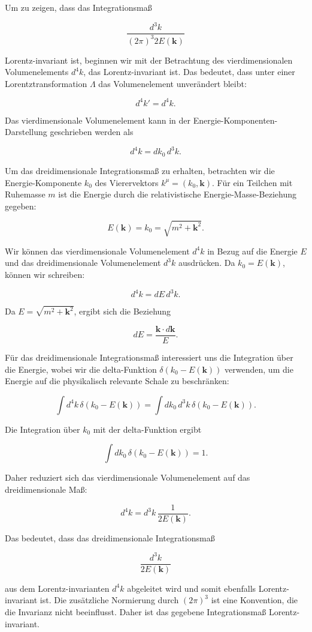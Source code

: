 Um zu zeigen, dass das Integrationsmaß 

\[
\frac{d^3 k}{(2 \pi)^3 2 E(\mathbf{k})}
\]

Lorentz-invariant ist, beginnen wir mit der Betrachtung des vierdimensionalen Volumenelements \(d^4 k\), das Lorentz-invariant ist. Das bedeutet, dass unter einer Lorentztransformation \(\Lambda\) das Volumenelement unverändert bleibt:

\[
d^4 k' = d^4 k.
\]

Das vierdimensionale Volumenelement kann in der Energie-Komponenten-Darstellung geschrieben werden als

\[
d^4 k = dk_0 \, d^3 k.
\]

Um das dreidimensionale Integrationsmaß zu erhalten, betrachten wir die Energie-Komponente \(k_0\) des Vierervektors \(k^\mu = (k_0, \mathbf{k})\). Für ein Teilchen mit Ruhemasse \(m\) ist die Energie durch die relativistische Energie-Masse-Beziehung gegeben:

\[
E(\mathbf{k}) = k_0 = \sqrt{m^2 + \mathbf{k}^2}.
\]

Wir können das vierdimensionale Volumenelement \(d^4 k\) in Bezug auf die Energie \(E\) und das dreidimensionale Volumenelement \(d^3 k\) ausdrücken. Da \(k_0 = E(\mathbf{k})\), können wir schreiben:

\[
d^4 k = dE \, d^3 k.
\]

Da \(E = \sqrt{m^2 + \mathbf{k}^2}\), ergibt sich die Beziehung

\[
dE = \frac{\mathbf{k} \cdot d\mathbf{k}}{E}.
\]

Für das dreidimensionale Integrationsmaß interessiert uns die Integration über die Energie, wobei wir die delta-Funktion \(\delta(k_0 - E(\mathbf{k}))\) verwenden, um die Energie auf die physikalisch relevante Schale zu beschränken:

\[
\int d^4 k \, \delta(k_0 - E(\mathbf{k})) = \int dk_0 \, d^3 k \, \delta(k_0 - E(\mathbf{k})).
\]

Die Integration über \(k_0\) mit der delta-Funktion ergibt

\[
\int dk_0 \, \delta(k_0 - E(\mathbf{k})) = 1.
\]

Daher reduziert sich das vierdimensionale Volumenelement auf das dreidimensionale Maß:

\[
d^4 k = d^3 k \, \frac{1}{2 E(\mathbf{k})}.
\]

Das bedeutet, dass das dreidimensionale Integrationsmaß

\[
\frac{d^3 k}{2 E(\mathbf{k})}
\]

aus dem Lorentz-invarianten \(d^4 k\) abgeleitet wird und somit ebenfalls Lorentz-invariant ist. Die zusätzliche Normierung durch \((2 \pi)^3\) ist eine Konvention, die die Invarianz nicht beeinflusst. Daher ist das gegebene Integrationsmaß Lorentz-invariant.